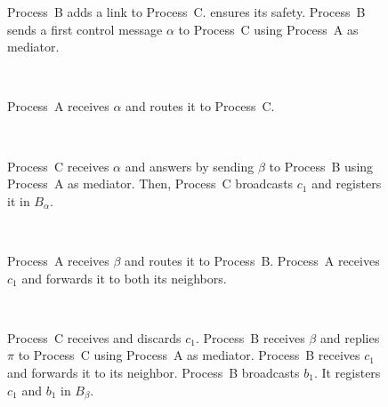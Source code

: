 \begin{algorithm*}[h]
  
  \caption{\label{algo:rpcbroadcast}\RPCBROADCAST at Process $p$.}
\end{algorithm*}


\begin{figure*}
  \begin{center}
    \begin{subfigure}[t]{0.36\textwidth}
      \caption{\label{fig:solveA}Process~B adds a link to
        Process~C. \RPCBROADCAST ensures its safety. Process~B sends a first
        control message $\alpha$ to Process~C using Process~A as mediator.}
    \end{subfigure}
    ~
    \begin{subfigure}[t]{0.27\textwidth}
      \begin{center}
        \caption{\label{fig:solveB}Process~A receives $\alpha$ and routes it to
          Process~C.}
      \end{center}
    \end{subfigure}
    ~
    \begin{subfigure}[t]{0.32\textwidth}
      \caption{\label{fig:solveC}Process~C receives $\alpha$ and answers by
        sending $\beta$ to Process~B using Process~A as mediator. Then,
        Process~C broadcasts $c_1$ and registers it in $B_\alpha$.}
    \end{subfigure}      
    \\
    \begin{subfigure}[t]{0.38\textwidth}
      \caption{\label{fig:solveD}Process~A receives $\beta$ and routes it to
        Process~B.  Process~A receives $c_1$ and forwards it to both its
        neighbors.}
    \end{subfigure}
    ~
    \begin{subfigure}[t]{0.58\textwidth}
      \begin{center}
      \caption{\label{fig:solveE}Process~C receives and discards
        $c_1$.  Process~B receives $\beta$ and replies $\pi$ to
        Process~C using Process~A as mediator.  Process~B receives
        $c_1$ and forwards it to its neighbor.  Process~B broadcasts
        $b_1$. It registers $c_1$ and $b_1$ in $B_\beta$.}
      \end{center}
    \end{subfigure}
    \\

\end{center}
\end{figure*}
